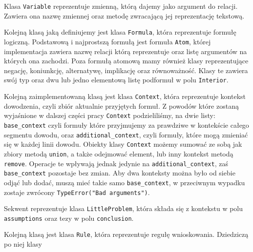 \documentclass{article}
\begin{document}
Klasa \texttt{Variable} reprezentuje zmienną, którą dajemy jako argument do relacji. Zawiera ona nazwę zmiennej oraz metodę zwracającą jej reprezentację tekstową.


Kolejną klasą jaką definiujemy jest klasa \texttt{Formula}, która reprezentuje formułę logiczną. Podstawową i 
najprostszą formułą jest formuła \texttt{Atom}, której implementacja zawiera nazwę relacji którą reprezentuje oraz
listę argumentów na których ona zachodzi. Poza formułą atomową mamy również klasy reprezentujące negację, 
koniunkcję, alternatywę, implikację oraz równoważność. Klasy te zawiera swój typ oraz dwu lub jedno elementową
listę podformuł w polu \texttt{Interior}.


Kolejną zaimplementowaną klasą jest klasa \texttt{Context}, która reprezentuje kontekst dowodzenia, czyli zbiór
aktualnie przyjętych formuł. Z powodów które zostaną wyjaśnione w dalszej części pracy \texttt{Context} podzieliliśmy, na dwie listy: \texttt{base\_context} czyli formuły które przyjmujemy za prawdziwe w kontekście całego segmentu dowodu, oraz \texttt{additional\_context}, czyli formuły, które mogą zmieniać się w każdej linii dowodu. Obiekty klasy \texttt{Context} możemy sumować ze sobą jak zbiory metodą \texttt{union}, a także odejmować element, lub inny kontekst metodą \texttt{remove}. Operacje te wpływają jednak jedynie na \texttt{additional\_context}, zaś \texttt{base\_context} pozostaje bez zmian. Aby dwa konteksty można było od siebie odjąć lub dodać, muszą mieć takie samo \texttt{base\_context}, w przeciwnym wypadku zostaje zwrócony \texttt{TypeError("Bad arguments")}.


Sekwent reprezentuje klasa \texttt{LittleProblem}, która składa się z kontekstu w polu \texttt{assumptions} oraz tezy w polu \texttt{conclusion}.

Kolejną klasą jest klasa \texttt{Rule}, która reprezentuje regułę wnioskowania. Dziedziczą po niej klasy
\end{document}
